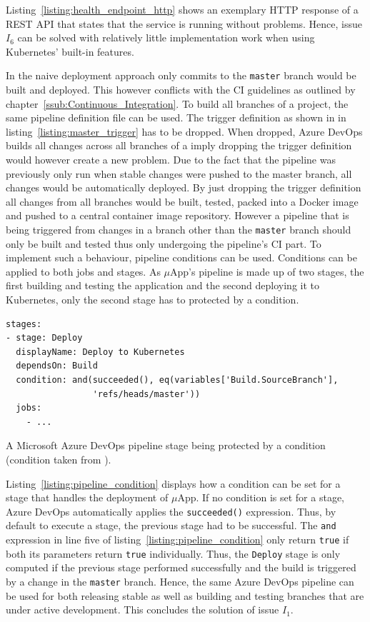Listing~\ref{listing:health_endpoint_http} shows an exemplary \ac{HTTP}
response of a \ac{REST} \ac{API} that states that the service is running
without problems. Hence, issue $I_6$ can be solved with relatively little
implementation work when using Kubernetes' built-in features.

In the naive deployment approach only commits to the \texttt{master} branch
would be built and deployed. This however conflicts with the \ac{CI} guidelines
as outlined by chapter~\ref{ssub:Continuous_Integration}. To build all branches
of a project, the same pipeline definition file can be used. The trigger
definition as shown in in listing~\ref{listing:master_trigger} has to be
dropped. When dropped, Azure DevOps builds all changes across all branches of a
imply dropping the trigger definition would however create a new problem. Due
to the fact that the pipeline was previously only run when stable changes were
pushed to the master branch, all changes would be automatically deployed. By
just dropping the trigger definition all changes from all branches would be
built, tested, packed into a Docker image and pushed to a central container
image repository. However a pipeline that is being triggered from changes in a
branch other than the \texttt{master} branch should only be built and tested
thus only undergoing the pipeline's \ac{CI} part. To implement such a
behaviour, pipeline conditions can be used. Conditions can be applied to both
jobs and stages. As $\mu$App's pipeline is made up of two stages, the first
building and testing the application and the second deploying it to Kubernetes,
only the second stage has to protected by a condition.

\begin{listing}[H]
  \begin{verbatim}
stages:
- stage: Deploy
  displayName: Deploy to Kubernetes
  dependsOn: Build
  condition: and(succeeded(), eq(variables['Build.SourceBranch'],
                 'refs/heads/master'))
  jobs:
    - ...
  \end{verbatim}
  \caption{A Microsoft Azure DevOps pipeline stage being protected by a
  condition (condition taken from \autocite{MicrosoftConditions2019}).}%
  \label{listing:pipeline_condition}
\end{listing}

Listing~\ref{listing:pipeline_condition} displays how a condition can be set
for a stage that handles the deployment of $\mu$App. If no condition is set for
a stage, Azure DevOps automatically applies the \texttt{succeeded()}
expression. Thus, by default to execute a stage, the previous stage had to be
successful. The \texttt{and} expression in line five of
listing~\ref{listing:pipeline_condition} only return \texttt{true} if both its
parameters return \texttt{true} individually. Thus, the \texttt{Deploy} stage
is only computed if the previous stage performed successfully and the build is
triggered by a change in the \texttt{master} branch. Hence, the same Azure
DevOps pipeline can be used for both releasing stable as well as building and
testing branches that are under active development. This concludes the solution
of issue $I_1$.

